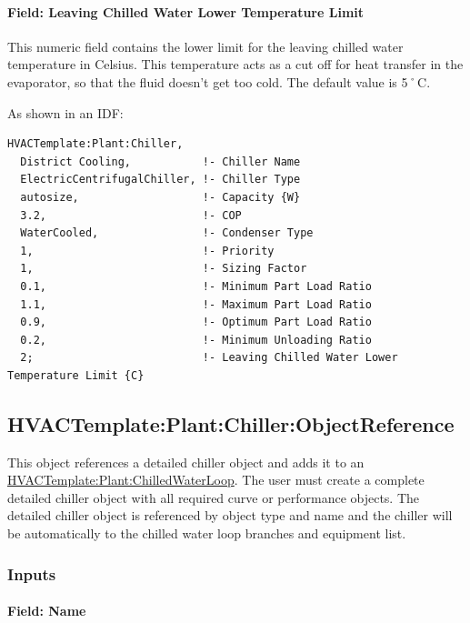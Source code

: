 \paragraph{Field: Leaving Chilled Water Lower Temperature Limit}\label{field-leaving-chilled-water-lower-temperature-limit}

This numeric field contains the lower limit for the leaving chilled water temperature in Celsius. This temperature acts as a cut off for heat transfer in the evaporator, so that the fluid doesn't get too cold. The default value is 5˚C.

As shown in an IDF:

\begin{lstlisting}
HVACTemplate:Plant:Chiller,
  District Cooling,           !- Chiller Name
  ElectricCentrifugalChiller, !- Chiller Type
  autosize,                   !- Capacity {W}
  3.2,                        !- COP
  WaterCooled,                !- Condenser Type
  1,                          !- Priority
  1,                          !- Sizing Factor
  0.1,                        !- Minimum Part Load Ratio
  1.1,                        !- Maximum Part Load Ratio
  0.9,                        !- Optimum Part Load Ratio
  0.2,                        !- Minimum Unloading Ratio
  2;                          !- Leaving Chilled Water Lower Temperature Limit {C}
\end{lstlisting}

\subsection{HVACTemplate:Plant:Chiller:ObjectReference}\label{hvactemplateplantchillerobjectreference}

This object references a detailed chiller object and adds it to an \hyperref[hvactemplateplantchilledwaterloop]{HVACTemplate:Plant:ChilledWaterLoop}. The user must create a complete detailed chiller object with all required curve or performance objects. The detailed chiller object is referenced by object type and name and the chiller will be automatically to the chilled water loop branches and equipment list.

\subsubsection{Inputs}\label{inputs-25-000}

\paragraph{Field: Name}\label{field-name-12-004}

